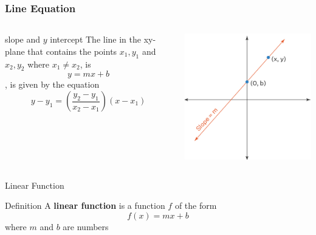 \documentclass{beamer}
\begin{document}
\begin{frame}
  \frametitle{Line Equation}
  \begin{columns} 
  \begin{alertblock}{slope and \(y\) intercept}
    The line in the xy-plane that contains the points \(x_{1},y_{1}\) and \(x_{2}, y_{2}\) where \(x_{1} \neq x_{2}\), is  
\[y = mx+b\], is given by the equation 
\[y-y_{1} = \left( \frac{y_{2} - y_{1}}{x_{2} - x_{1}} \right) (x-x_{1})\] 
  \end{alertblock}

  \centering
  \includegraphics[width=0.8\linewidth]{line2.png} %
  \end{columns}

\end{frame}

\begin{frame}{Linear Function}
  \begin{block}{Definition}
    A \textbf{linear function} is a function \(f\) of the form 
    \[f(x) = mx + b\]
    where \(m\) and \(b\) are numbers
    
  \end{block}
\end{frame}
\end{document}
